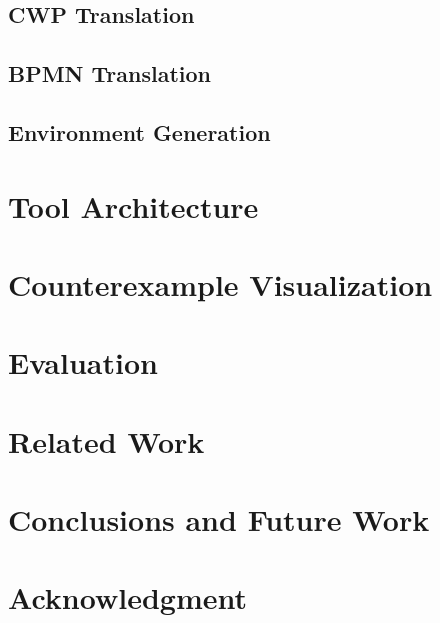 \documentclass[conference]{IEEEtran}
\begin{document}
\subsection{CWP Translation}
\label{sec:cwpTranslation}


\subsection{BPMN Translation}
\label{sec:bpmnReasoning}


\subsection{Environment Generation}
\label{sec:envConstruction}


\section{Tool Architecture}
\label{sec:toolArchitecture}


\section{Counterexample Visualization}
\label{sec:counterexample}


\section{Evaluation}
\label{sec:eval}


\section{Related Work}


\section{Conclusions and Future Work}


\section*{Acknowledgment}


{\small 
}
\end{document}
